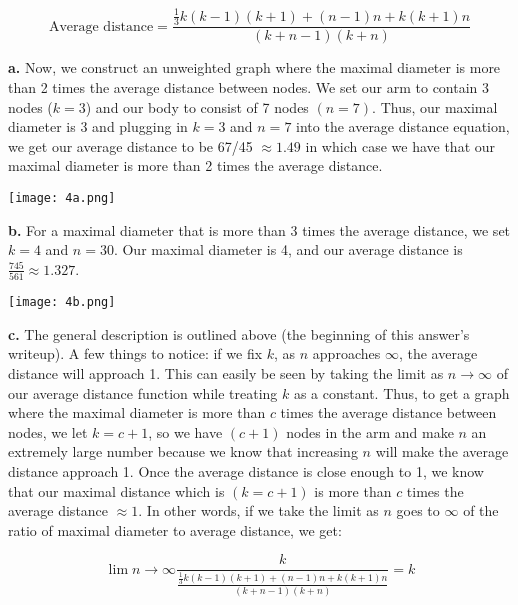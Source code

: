 \documentclass[12 pt]{article}
\begin{document}
	\begin{equation}
	\text{Average distance} = \frac{\frac{1}{3} k(k-1)(k+1) + (n-1)n + k(k+1)n}{(k+n-1)(k+n)} 
	\end{equation}
	
	\noindent \textbf {a.} Now, we construct an unweighted graph where the maximal diameter is more than 2 times the average distance between nodes. We set our arm to contain 3 nodes ($k=3$) and our body to consist of 7 nodes $(n=7)$. Thus, our maximal diameter is 3 and plugging in $k = 3$ and $n=7$ into the average distance equation, we get our average distance to be 67/45 $\approx 1.49$ in which case we have that our maximal diameter is more than 2 times the average distance.
	
	\begin{center}
		\texttt{[image: 4a.png]}
	\end{center}
	
	\noindent \textbf {b.} For a maximal diameter that is more than 3 times the average distance, we set $k = 4$ and $n = 30$. Our maximal diameter is 4, and our average distance is $\frac{745}{561} \approx 1.327$. 

	
	\begin{center}
		\texttt{[image: 4b.png]}
	\end{center}

	\noindent \textbf{c.} The general description is outlined above (the beginning of this answer's writeup). A few things to notice: if we fix $k$, as $n$ approaches $\infty$, the average distance will approach 1. This can easily be seen by taking the limit as $n \rightarrow \infty$ of our average distance function while treating $k$ as a constant. Thus, to get a graph where the maximal diameter is more than $c$ times the average distance between nodes, we let $k = c + 1$, so we have $(c+1)$ nodes in the arm and make $n$ an extremely large number because we know that increasing $n$ will make the average distance approach 1. Once the average distance is close enough to 1, we know that our maximal distance which is $(k = c + 1)$ is more than $c$ times the average distance $\approx 1$. In other words, if we take the limit as $n$ goes to $\infty$ of the ratio of maximal diameter to average distance, we get: 
	
	\begin{equation}
	\lim{n\to\infty}\frac{k}{\frac{\frac{1}{3} k(k-1)(k+1) + (n-1)n + k(k+1)n}{(k+n-1)(k+n)}} = k
	\end{equation}\\
	
\end{document}
